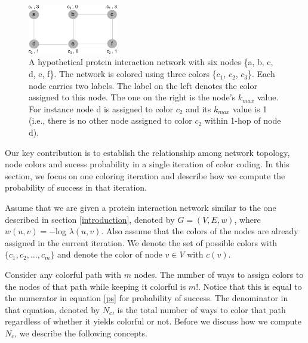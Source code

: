 \documentclass{ws-procs11x85}
\begin{document}
\begin{figure}
  \centering
  \includegraphics[width=0.35\textwidth]{figures/colors}
  \caption{ A hypothetical protein interaction network with six nodes
    \{a, b, c, d, e, f\}. The network is colored using three colors
    \{$c_1$, $c_2$, $c_3$\}. Each node carries two labels.  The label
    on the left denotes the color assigned to this node.  The one on
    the right is the node's $k_{max}$ value. For instance node d is
    assigned to color $c_2$ and its $k_{max}$ value is 1 (i.e., there
    is no other node assigned to color $c_2$ within 1-hop of node d). }
  \label{fig:colors}
\end{figure}


Our key contribution is to establish the relationship among network
topology, node colors and sucess probability in a single iteration of
color coding. In this section, we focus on one coloring iteration and
describe how we compute the probability of success in that iteration.

Assume that we are given a protein interaction network similar to the one
described in section \ref{introduction}, denoted by $G = (V, E, w)$, where
$w(u, v) = -$log $\lambda(u, v)$. Also assume that the colors of the nodes are
already assigned in the current iteration. We denote the set of possible colors
with $\{c_1, c_2, \ldots , c_m\}$ and denote the color of node $v \in V$ with
$c(v)$.

Consider any colorful path with $m$ nodes. The number of ways to assign colors
to the nodes of that path while keeping it colorful is $m!$. Notice that this is
equal to the numerator in equation \ref{ps} for probability of success. The
denominator in that equation, denoted by $N_c$, is the total number of ways to
color that path regardless of whether it yields colorful or not. Before we
discuss how we compute $N_c$, we describe the following concepts.
\end{document}
